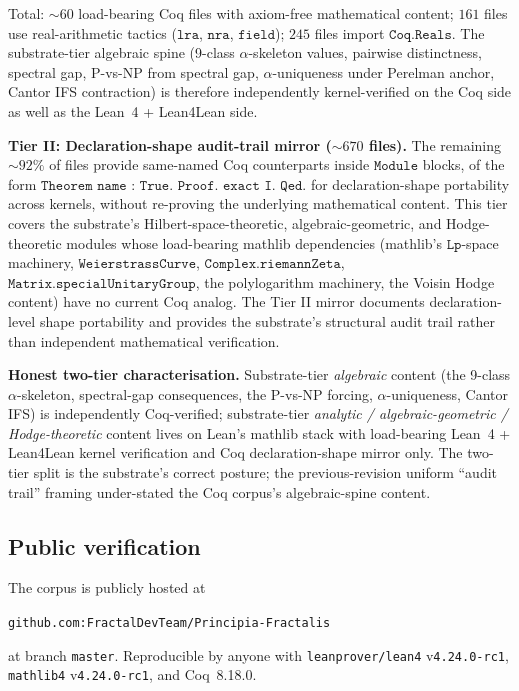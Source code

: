 \documentclass[11pt,a4paper]{amsart}
\theoremstyle{plain}
\theoremstyle{definition}
\begin{document}
Total: $\sim 60$ load-bearing Coq files with axiom-free mathematical content; $161$ files use real-arithmetic tactics ($\texttt{lra}$, $\texttt{nra}$, $\texttt{field}$); $245$ files import $\texttt{Coq.Reals}$. The substrate-tier algebraic spine (9-class $\alpha$-skeleton values, pairwise distinctness, spectral gap, P-vs-NP from spectral gap, $\alpha$-uniqueness under Perelman anchor, Cantor IFS contraction) is therefore independently kernel-verified on the Coq side as well as the Lean~4 + Lean4Lean side.

\textbf{Tier II: Declaration-shape audit-trail mirror ($\sim 670$ files).} The remaining $\sim 92\%$ of files provide same-named Coq counterparts inside $\texttt{Module}$ blocks, of the form $\texttt{Theorem name : True. Proof. exact I. Qed.}$ for declaration-shape portability across kernels, without re-proving the underlying mathematical content. This tier covers the substrate's Hilbert-space-theoretic, algebraic-geometric, and Hodge-theoretic modules whose load-bearing mathlib dependencies (mathlib's $\texttt{Lp}$-space machinery, $\texttt{WeierstrassCurve}$, $\texttt{Complex.riemannZeta}$, $\texttt{Matrix.specialUnitaryGroup}$, the polylogarithm machinery, the Voisin Hodge content) have no current Coq analog. The Tier II mirror documents declaration-level shape portability and provides the substrate's structural audit trail rather than independent mathematical verification.

\textbf{Honest two-tier characterisation.} Substrate-tier \emph{algebraic} content (the 9-class $\alpha$-skeleton, spectral-gap consequences, the P-vs-NP forcing, $\alpha$-uniqueness, Cantor IFS) is independently Coq-verified; substrate-tier \emph{analytic / algebraic-geometric / Hodge-theoretic} content lives on Lean's mathlib stack with load-bearing Lean~4 + Lean4Lean kernel verification and Coq declaration-shape mirror only. The two-tier split is the substrate's correct posture; the previous-revision uniform ``audit trail'' framing under-stated the Coq corpus's algebraic-spine content.

\subsection{Public verification}

The corpus is publicly hosted at
\begin{center}
\texttt{github.com:FractalDevTeam/Principia-Fractalis}
\end{center}
at branch \texttt{master}. Reproducible by anyone with \texttt{leanprover/lean4} v\texttt{4.24.0-rc1}, \texttt{mathlib4} v\texttt{4.24.0-rc1}, and Coq~8.18.0.
\end{document}

